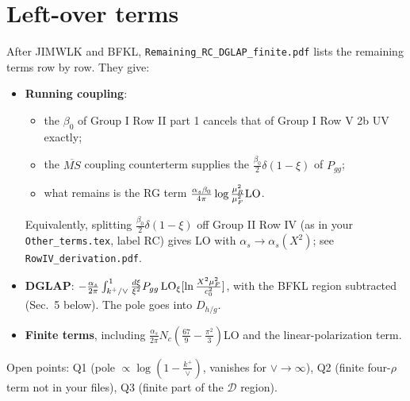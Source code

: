 \documentclass[10pt]{article}
\begin{document}
\section{Left-over terms}
After JIMWLK and BFKL, \texttt{Remaining\_RC\_DGLAP\_finite.pdf} lists the remaining terms row by row. They give:
\begin{itemize}
\item \textbf{Running coupling}:
\begin{itemize}
\item the $\beta_0$ of Group I Row II part 1 cancels that of Group I Row V 2b UV exactly;
\item the $\overline{MS}$ coupling counterterm supplies the $\frac{\beta_0}{2}\delta(1-\xi)$ of $P_{gg}$;
\item what remains is the RG term $\frac{\alpha_s\beta_0}{4\pi}\log\frac{\mu_R^2}{\mu_F^2}{\rm LO}$.
\end{itemize}
Equivalently, splitting $\frac{\beta_0}{2}\delta(1-\xi)$ off Group II Row IV (as in your \texttt{Other\_terms.tex}, label RC) gives LO with $\alpha_s\to\alpha_s(X^2)$; see \texttt{RowIV\_derivation.pdf}.
\item \textbf{DGLAP}: $-\frac{\alpha_s}{2\pi}\int_{k^+/\vee}^1\frac{d\xi}{\xi^2}P_{gg}\,{\rm LO}_\xi[\ln\frac{X^2\mu_F^2}{c_0^2}]$, with the BFKL region subtracted (Sec.~5 below). The pole goes into $D_{h/g}$.
\item \textbf{Finite terms}, including $\frac{\alpha_s}{2\pi}N_c(\frac{67}{9}-\frac{\pi^2}{3})$LO and the linear-polarization term.
\end{itemize}
Open points: Q1 (pole $\propto\log(1-\frac{k^+}{\vee})$, vanishes for $\vee\to\infty$), Q2 (finite four-$\rho$ term not in your files), Q3 (finite part of the $\mathcal D$ region).
\end{document}
